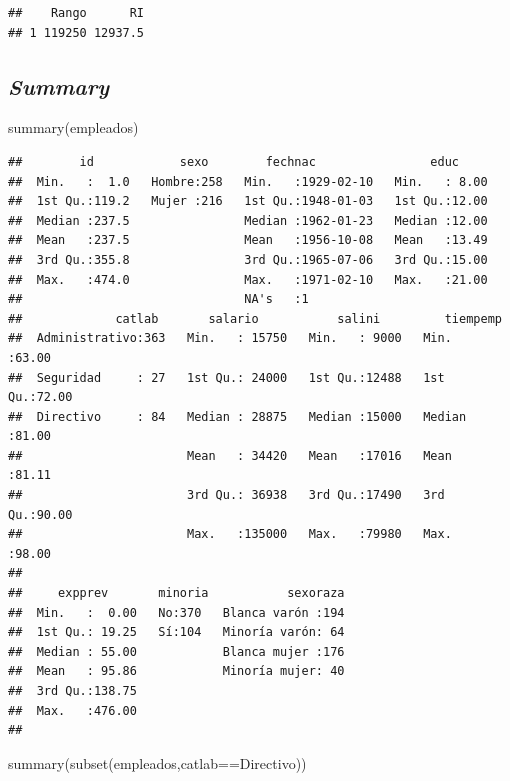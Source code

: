 \documentclass[
]{book}
\newenvironment{Shaded}{\begin{snugshade}}{\end{snugshade}}
\newcommand{\FunctionTok}[1]{\textcolor[rgb]{0.00,0.00,0.00}{#1}}
\newcommand{\NormalTok}[1]{#1}
\newcommand{\SpecialCharTok}[1]{\textcolor[rgb]{0.00,0.00,0.00}{#1}}
\newcommand{\StringTok}[1]{\textcolor[rgb]{0.31,0.60,0.02}{#1}}
\theoremstyle{break}
\begin{document}
\begin{verbatim}
##    Rango      RI
## 1 119250 12937.5
\end{verbatim}

\hypertarget{summary}{%
\subsection{\texorpdfstring{\emph{Summary}}{Summary}}\label{summary}}

\begin{Shaded}
\begin{Highlighting}[]
\FunctionTok{summary}\NormalTok{(empleados)}
\end{Highlighting}
\end{Shaded}

\begin{verbatim}
##        id            sexo        fechnac                educ      
##  Min.   :  1.0   Hombre:258   Min.   :1929-02-10   Min.   : 8.00  
##  1st Qu.:119.2   Mujer :216   1st Qu.:1948-01-03   1st Qu.:12.00  
##  Median :237.5                Median :1962-01-23   Median :12.00  
##  Mean   :237.5                Mean   :1956-10-08   Mean   :13.49  
##  3rd Qu.:355.8                3rd Qu.:1965-07-06   3rd Qu.:15.00  
##  Max.   :474.0                Max.   :1971-02-10   Max.   :21.00  
##                               NA's   :1                           
##             catlab       salario           salini         tiempemp    
##  Administrativo:363   Min.   : 15750   Min.   : 9000   Min.   :63.00  
##  Seguridad     : 27   1st Qu.: 24000   1st Qu.:12488   1st Qu.:72.00  
##  Directivo     : 84   Median : 28875   Median :15000   Median :81.00  
##                       Mean   : 34420   Mean   :17016   Mean   :81.11  
##                       3rd Qu.: 36938   3rd Qu.:17490   3rd Qu.:90.00  
##                       Max.   :135000   Max.   :79980   Max.   :98.00  
##                                                                       
##     expprev       minoria           sexoraza  
##  Min.   :  0.00   No:370   Blanca varón :194  
##  1st Qu.: 19.25   Sí:104   Minoría varón: 64  
##  Median : 55.00            Blanca mujer :176  
##  Mean   : 95.86            Minoría mujer: 40  
##  3rd Qu.:138.75                               
##  Max.   :476.00                               
## 
\end{verbatim}

\begin{Shaded}
\begin{Highlighting}[]
\FunctionTok{summary}\NormalTok{(}\FunctionTok{subset}\NormalTok{(empleados,catlab}\SpecialCharTok{==}\StringTok{\textquotesingle{}Directivo\textquotesingle{}}\NormalTok{))}
\end{Highlighting}
\end{Shaded}
\end{document}

